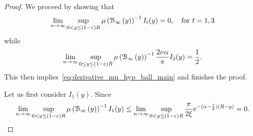 \begin{proof}
We proceed by showing that
\begin{equation}\label{eq:derivative_hyp_ball_error_1}
	\lim_{n \to \infty} \sup_{0 < y \le (1-\varepsilon)R} \mu\left({\mathcal B}_{\infty}\left(y\right)\right)^{-1} I_t(y) = 0, \quad \text{for } t = 1,3
\end{equation}
while
\begin{equation}\label{eq:derivative_hyp_ball_main_part}
	\lim_{n \to \infty} \sup_{0 \le y \le (1-\varepsilon)R} \mu\left({\mathcal B}_{\infty}\left(y\right)\right)^{-1} \frac{2\nu \alpha}{\pi} I_2(y) = \frac{1}{2}.
\end{equation}
This then implies~\eqref{eq:derivative_mu_hyp_ball_main} and finishes the proof.

Let us first consider $I_1(y)$. Since 
\[
	\lim_{n \to \infty} \sup_{0 < y \le (1-\varepsilon)R} \mu\left({\mathcal B}_{\infty}\left(y\right)\right)^{-1} I_1(y) 
	\le \lim_{n \to \infty} \sup_{0 < y \le (1-\varepsilon)R} \frac{\pi}{2\xi} e^{-(\alpha - \frac{1}{2})(R - y)} = 0.
\]


\end{proof}
